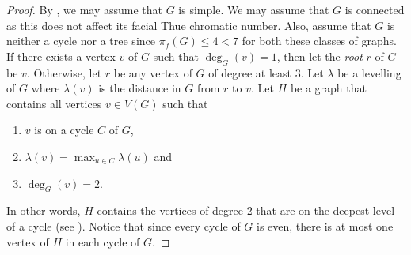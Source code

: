 \documentclass{patmorin}
\begin{document}
\begin{proof}
 By , we may assume that $G$ is simple.
 We may assume that $G$ is connected as this does not affect its facial
 Thue chromatic number. Also, assume that $G$ is neither a cycle nor
 a tree since $\pi_f(G) \leq 4 < 7$ for both these classes of graphs.
 If there exists a vertex $v$ of $G$ such that $\deg_G(v)=1$, then let
 the \emph{root} $r$ of $G$ be $v$. Otherwise, let $r$ be any vertex
 of $G$ of degree at least $3$. Let $\lambda$ be a levelling of $G$
 where $\lambda(v)$ is the distance in $G$ from $r$ to $v$. Let $H$
 be a graph that contains all vertices $v\in V(G)$ such that
 \begin{enumerate}
  \item $v$ is on a cycle $C$ of $G$,
  \item $\lambda(v)=\max_{u \in C} \lambda(u)$ and
  \item $\deg_G(v)=2$.
 \end{enumerate} 
 In other words, $H$ contains the vertices of degree 2 that are on the
 deepest level of a cycle (see ). Notice that
 since every cycle of $G$ is even, there is at most one vertex of $H$
 in each cycle of $G$.


\end{proof}
\end{document}
